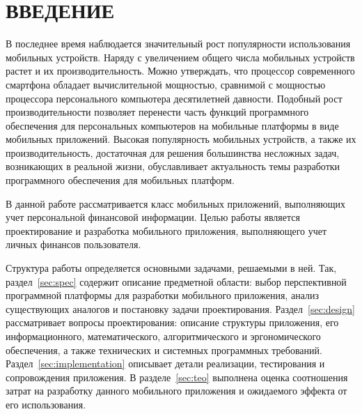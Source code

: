 \section*{ВВЕДЕНИЕ}

В последнее время наблюдается значительный рост
популярности использования мобильных устройств.
Наряду с увеличением общего числа мобильных
устройств растет и их производительность.
Можно утверждать, что процессор современного смартфона обладает
вычислительной мощностью, сравнимой с мощностью процессора
персонального компьютера десятилетней давности.
Подобный рост производительности позволяет перенести часть функций
программного обеспечения для персональных компьютеров
на мобильные платформы в виде мобильных приложений.
Высокая популярность мобильных устройств, а также
их производительность, достаточная для решения большинства
несложных задач, возникающих в реальной жизни, обуславливает
актуальность темы разработки программного обеспечения
для мобильных платформ.

В данной работе рассматривается класс мобильных приложений,
выполняющих учет персональной финансовой информации.
Целью работы является проектирование и разработка мобильного приложения,
выполняющего учет личных финансов пользователя.

Структура работы определяется основными задачами, решаемыми в ней.
Так, раздел~\ref{sec:spec} содержит описание предметной области:
выбор перспективной программной платформы для разработки мобильного
приложения, анализ существующих аналогов и постановку задачи проектирования.
Раздел~\ref{sec:design} рассматривает вопросы проектирования:
описание структуры приложения, его информационного, математического,
алгоритмического и эргономического обеспечения,
а также технических и системных программных требований.
Раздел~\ref{sec:implementation} описывает детали реализации,
тестирования и сопровождения приложения.
В разделе~\ref{sec:teo} выполнена оценка соотношения затрат
на разработку данного мобильного приложения и ожидаемого эффекта
от его использования.
